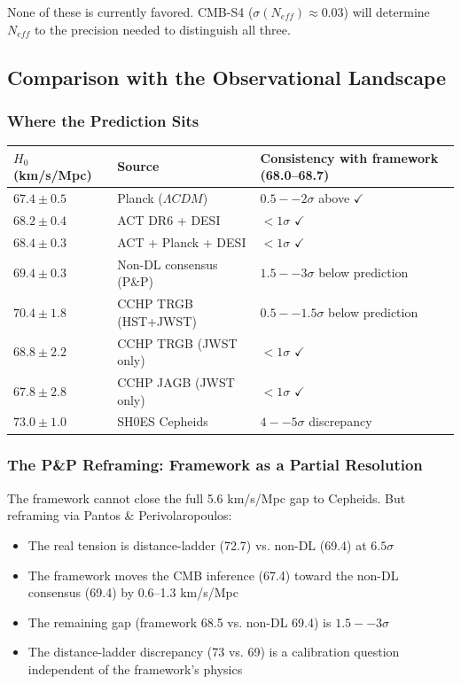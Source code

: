 \documentclass[aps,prd,preprint,superscriptaddress,longbibliography,floatfix]{revtex4-2}
\theoremstyle{remark}
\begin{document}
None of these is currently favored. CMB-S4 ($\sigma(N_{eff}) \approx 0.03$) will determine $N_{eff}$ to the precision needed to distinguish all three.



\subsection{Comparison with the Observational Landscape}


\subsubsection{Where the Prediction Sits}


\begin{table}[H]
\begin{ruledtabular}
\begin{tabular}{p{5.0cm}p{5.0cm}p{5.0cm}}
$H_{0}$ (km/s/Mpc) & Source & Consistency with framework (68.0--68.7) \\
\hline
$67.4 \pm 0.5$ & Planck ($\Lambda CDM$) & $0.5--2\sigma$ above $\checkmark$ \\
$68.2 \pm 0.4$ & ACT DR6 + DESI & \textbf{$< 1\sigma$} $\checkmark$ \\
$68.4 \pm 0.3$ & ACT + Planck + DESI & \textbf{$< 1\sigma$} $\checkmark$ \\
$69.4 \pm 0.3$ & Non-DL consensus (P\&P) & $1.5--3\sigma$ below prediction \\
$70.4 \pm 1.8$ & CCHP TRGB (HST+JWST) & $0.5--1.5\sigma$ below prediction \\
$68.8 \pm 2.2$ & CCHP TRGB (JWST only) & \textbf{$< 1\sigma$} $\checkmark$ \\
$67.8 \pm 2.8$ & CCHP JAGB (JWST only) & $< 1\sigma$ $\checkmark$ \\
$73.0 \pm 1.0$ & SH0ES Cepheids & $4--5\sigma$ discrepancy \\
\end{tabular}
\end{ruledtabular}
\end{table}


\subsubsection{The P\&P Reframing: Framework as a Partial Resolution}

The framework cannot close the full 5.6 km/s/Mpc gap to Cepheids. But reframing via Pantos \& Perivolaropoulos:


\begin{itemize}
  \item The real tension is distance-ladder (72.7) vs. non-DL (69.4) at $6.5\sigma$
  \item The framework moves the CMB inference (67.4) toward the non-DL consensus (69.4) by 0.6--1.3 km/s/Mpc
  \item The remaining gap (framework 68.5 vs. non-DL 69.4) is $1.5--3\sigma$
  \item The distance-ladder discrepancy (73 vs. 69) is a calibration question independent of the framework's physics
\end{itemize}
\end{document}
